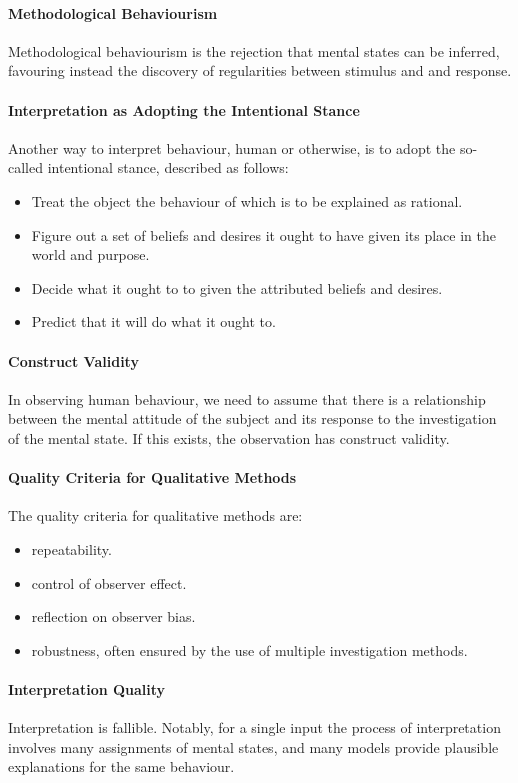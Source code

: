 \paragraph{Methodological Behaviourism}
Methodological behaviourism is the rejection that mental states can be inferred, favouring instead the discovery of regularities between stimulus and and response.

\paragraph{Interpretation as Adopting the Intentional Stance}
Another way to interpret behaviour, human or otherwise, is to adopt the so-called intentional stance, described as follows:
\begin{itemize}
	\item Treat the object the behaviour of which is to be explained as rational.
	\item Figure out a set of beliefs and desires it ought to have given its place in the world and purpose.
	\item Decide what it ought to to given the attributed beliefs and desires.
	\item Predict that it will do what it ought to.
\end{itemize}

\paragraph{Construct Validity}
In observing human behaviour, we need to assume that there is a relationship between the mental attitude of the subject and its response to the investigation of the mental state. If this exists, the observation has construct validity.

\paragraph{Quality Criteria for Qualitative Methods}
The quality criteria for qualitative methods are:
\begin{itemize}
	\item repeatability.
	\item control of observer effect.
	\item reflection on observer bias.
	\item robustness, often ensured by the use of multiple investigation methods.
\end{itemize}

\paragraph{Interpretation Quality}
Interpretation is fallible. Notably, for a single input the process of interpretation involves many assignments of mental states, and many models provide plausible explanations for the same behaviour.


